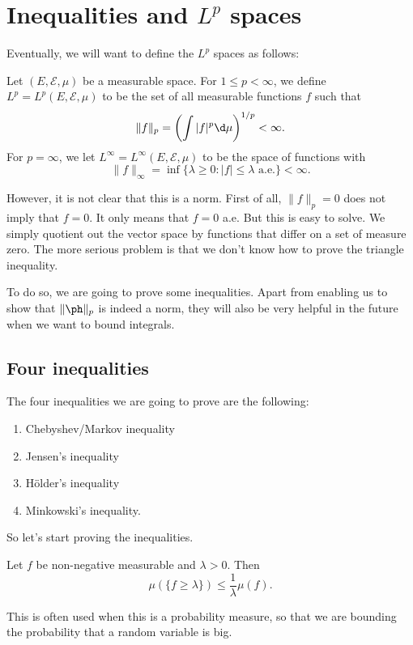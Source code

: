 \documentclass[a4paper]{article}
\begin{document}
\section{Inequalities and \texorpdfstring{$L^p$}{Lp} spaces}
Eventually, we will want to define the $L^p$ spaces as follows:
\begin{defi}[$L^p$ spaces]
  Let $(E, \mathcal{E}, \mu)$ be a measurable space. For $1 \leq p < \infty$, we define $L^p = L^p(E, \mathcal{E}, \mu)$ to be the set of all measurable functions $f$ such that
  \[
    \|f\|_p = \left(\int |f|^p \d \mu\right)^{1/p} < \infty.
  \]
  For $p = \infty$, we let $L^\infty = L^\infty(E, \mathcal{E}, \mu)$ to be the space of functions with
  \[
    \|f\|_{\infty} = \inf \{\lambda \geq 0: |f| \leq \lambda \text{ a.e.}\} < \infty.
  \]
\end{defi}
However, it is not clear that this is a norm. First of all, $\|f\|_p = 0$ does not imply that $f = 0$. It only means that $f = 0$ a.e. But this is easy to solve. We simply quotient out the vector space by functions that differ on a set of measure zero. The more serious problem is that we don't know how to prove the triangle inequality.

To do so, we are going to prove some inequalities. Apart from enabling us to show that $\| \ph \|_p$ is indeed a norm, they will also be very helpful in the future when we want to bound integrals.

\subsection{Four inequalities}
The four inequalities we are going to prove are the following:
\begin{enumerate}
  \item Chebyshev/Markov inequality
  \item Jensen's inequality
  \item H\"older's inequality
  \item Minkowski's inequality.
\end{enumerate}

So let's start proving the inequalities.
\begin{prop}
  Let $f$ be non-negative measurable and $\lambda > 0$. Then
  \[
    \mu(\{f \geq \lambda\}) \leq \frac{1}{\lambda} \mu(f).
  \]
\end{prop}
This is often used when this is a probability measure, so that we are bounding the probability that a random variable is big.
\end{document}
